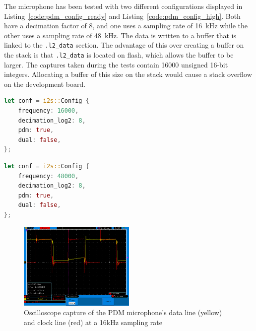 \begin{minipage}{\textwidth}
The microphone has been tested with two different configurations displayed in Listing~\ref{code:pdm_config_ready} and Listing~\ref{code:pdm_config_high}.
Both have a decimation factor of 8, and one uses a sampling rate of \SI{16}{\kilo\hertz} while the other uses a sampling rate of \SI{48}{\kilo\hertz}.
The data is written to a buffer that is linked to the \lstinline{.l2_data} section.
The advantage of this over creating a buffer on the stack is that \lstinline{.l2_data} is located on flash, which allows the buffer to be larger.
The captures taken during the tests contain 16000 unsigned 16-bit integers.
Allocating a buffer of this size on the stack would cause a stack overflow on the development board.

\begin{lstlisting}[style=colorEX,language=Rust,caption={Updated configuration of the PDM microphone with a 16kHz sampling rate},label={code:pdm_config_ready}]
let conf = i2s::Config {
    frequency: 16000,
    decimation_log2: 8,
    pdm: true,
    dual: false,
};
\end{lstlisting}

\begin{lstlisting}[style=colorEX,language=Rust,caption={Updated configuration of the PDM microphone with a 48kHz sampling rate},label={code:pdm_config_high}]
let conf = i2s::Config {
    frequency: 48000,
    decimation_log2: 8,
    pdm: true,
    dual: false,
};
\end{lstlisting}
\end{minipage}

\begin{figure}[H]
    \begin{center}
        \includegraphics[width=0.5\textwidth]{figures/16k_1mhz_sine.png}
    \end{center}
    \caption[Oscilloscope capture of the PDM microphone's data line (yellow) and clock line (red) at a 16kHz sampling rate]
    {Oscilloscope capture of the PDM microphone's data line (yellow) and clock line (red) at a 16kHz sampling rate}
    \label{fig:pdm_16k}
\end{figure}


